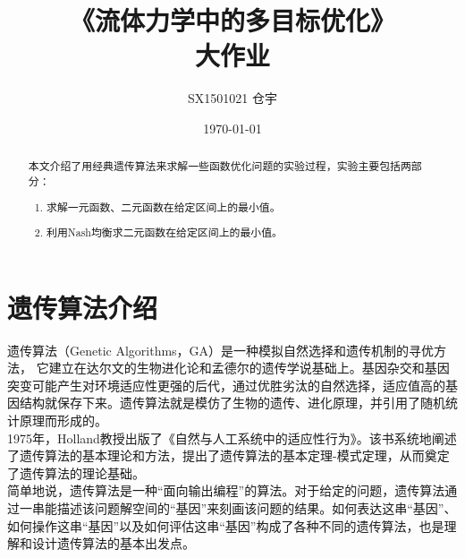 \documentclass[UTF8]{ctexart}
\title{\heiti 《流体力学中的多目标优化》 \\ 大作业}
\author{SX1501021 仓宇}
\date{\today}
\begin{document}
\maketitle
\setcounter{page}{0}
\thispagestyle{empty}

\clearpage

\begin{abstract}
本文介绍了用经典遗传算法来求解一些函数优化问题的实验过程，实验主要包括两部分：
\begin{enumerate}[(1)]
\item 求解一元函数、二元函数在给定区间上的最小值。
\item 利用Nash均衡求二元函数在给定区间上的最小值。
\end{enumerate}
\end{abstract}

\clearpage

\tableofcontents

\clearpage

\section{遗传算法介绍}
遗传算法（Genetic Algorithms，GA）是一种模拟自然选择和遗传机制的寻优方法， 它建立在达尔文的生物进化论和孟德尔的遗传学说基础上。基因杂交和基因突变可能产生对环境适应性更强的后代，通过优胜劣汰的自然选择，适应值高的基因结构就保存下来。遗传算法就是模仿了生物的遗传、进化原理，并引用了随机统计原理而形成的。\\
\indent 1975年，Holland教授出版了《自然与人工系统中的适应性行为》。该书系统地阐述了遗传算法的基本理论和方法，提出了遗传算法的基本定理-模式定理，从而奠定了遗传算法的理论基础。\\
\indent 简单地说，遗传算法是一种“面向输出编程”的算法。对于给定的问题，遗传算法通过一串能描述该问题解空间的“基因”来刻画该问题的结果。如何表达这串“基因”、如何操作这串“基因”以及如何评估这串“基因”构成了各种不同的遗传算法，也是理解和设计遗传算法的基本出发点。\\
\end{document}
